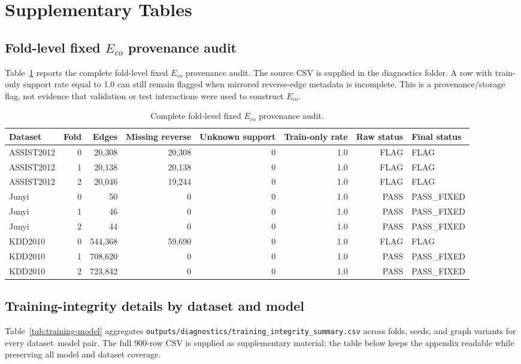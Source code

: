 \documentclass[11pt,a4paper]{article}
\newcommand{\Eco}{$E_{co}$}
\begin{document}
\appendix

\section{Supplementary Tables}
\subsection{Fold-level fixed \Eco{} provenance audit}
Table~\ref{tab:eco-fold-fixed} reports the complete fold-level fixed \Eco{} provenance audit. The source CSV is supplied in the diagnostics folder. A row with train-only support rate equal to 1.0 can still remain flagged when mirrored reverse-edge metadata is incomplete. This is a provenance/storage flag, not evidence that validation or test interactions were used to construct \Eco{}.

\begin{table}[H]
\centering
\caption{Complete fold-level fixed \Eco{} provenance audit.}
\label{tab:eco-fold-fixed}
\scriptsize
\begin{adjustbox}{max width=\textwidth}
\begin{tabular}{lrrrrrrl}
\toprule
Dataset & Fold & Edges & Missing reverse & Unknown support & Train-only rate & Raw status & Final status \\
\midrule
ASSIST2012 & 0 & 20,308 & 20,308 & 0 & 1.0 & FLAG & FLAG \\
ASSIST2012 & 1 & 20,138 & 20,138 & 0 & 1.0 & FLAG & FLAG \\
ASSIST2012 & 2 & 20,046 & 19,244 & 0 & 1.0 & FLAG & FLAG \\
Junyi & 0 & 50 & 0 & 0 & 1.0 & PASS & PASS\_FIXED \\
Junyi & 1 & 46 & 0 & 0 & 1.0 & PASS & PASS\_FIXED \\
Junyi & 2 & 44 & 0 & 0 & 1.0 & PASS & PASS\_FIXED \\
KDD2010 & 0 & 544,368 & 59,690 & 0 & 1.0 & FLAG & FLAG \\
KDD2010 & 1 & 708,620 & 0 & 0 & 1.0 & PASS & PASS\_FIXED \\
KDD2010 & 2 & 723,842 & 0 & 0 & 1.0 & PASS & PASS\_FIXED \\
\bottomrule
\end{tabular}
\end{adjustbox}
\end{table}

\subsection{Training-integrity details by dataset and model}
Table~\ref{tab:training-model} aggregates \texttt{outputs/diagnostics/training\_integrity\_summary.csv} across folds, seeds, and graph variants for every dataset--model pair. The full 900-row CSV is supplied as supplementary material; the table below keeps the appendix readable while preserving all model and dataset coverage.
\end{document}
